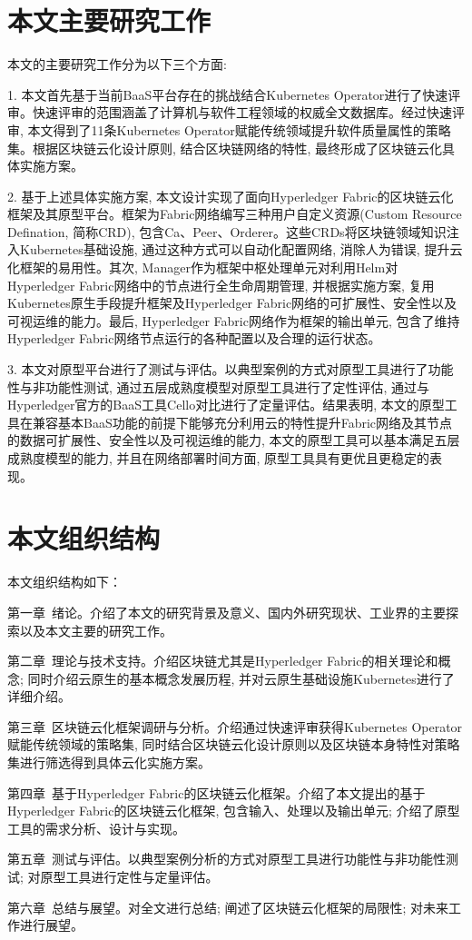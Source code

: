 \section{本文主要研究工作}

本文的主要研究工作分为以下三个方面: 

1. 本文首先基于当前BaaS平台存在的挑战结合Kubernetes Operator进行了快速评审。快速评审的范围涵盖了计算机与软件工程领域的权威全文数据库。经过快速评审, 本文得到了11条Kubernetes Operator赋能传统领域提升软件质量属性的策略集。根据区块链云化设计原则, 结合区块链网络的特性, 最终形成了区块链云化具体实施方案。

2. 基于上述具体实施方案, 本文设计实现了面向Hyperledger Fabric的区块链云化框架及其原型平台。框架为Fabric网络编写三种用户自定义资源(Custom Resource Defination, 简称CRD), 包含Ca、Peer、Orderer。这些CRDs将区块链领域知识注入Kubernetes基础设施, 通过这种方式可以自动化配置网络, 消除人为错误, 提升云化框架的易用性。其次, Manager作为框架中枢处理单元对利用Helm对Hyperledger Fabric网络中的节点进行全生命周期管理, 并根据实施方案, 复用Kubernetes原生手段提升框架及Hyperledger Fabric网络的可扩展性、安全性以及可视运维的能力。最后, Hyperledger Fabric网络作为框架的输出单元, 包含了维持Hyperledger Fabric网络节点运行的各种配置以及合理的运行状态。

3. 本文对原型平台进行了测试与评估。以典型案例的方式对原型工具进行了功能性与非功能性测试, 通过五层成熟度模型对原型工具进行了定性评估, 通过与Hyperledger官方的BaaS工具Cello对比进行了定量评估。结果表明, 本文的原型工具在兼容基本BaaS功能的前提下能够充分利用云的特性提升Fabric网络及其节点的数据可扩展性、安全性以及可视运维的能力, 本文的原型工具可以基本满足五层成熟度模型的能力, 并且在网络部署时间方面, 原型工具具有更优且更稳定的表现。


\section{本文组织结构}

本文组织结构如下：

第一章~绪论。介绍了本文的研究背景及意义、国内外研究现状、工业界的主要探索以及本文主要的研究工作。

第二章~理论与技术支持。介绍区块链尤其是Hyperledger Fabric的相关理论和概念; 同时介绍云原生的基本概念发展历程, 并对云原生基础设施Kubernetes进行了详细介绍。

第三章~区块链云化框架调研与分析。介绍通过快速评审获得Kubernetes Operator赋能传统领域的策略集, 同时结合区块链云化设计原则以及区块链本身特性对策略集进行筛选得到具体云化实施方案。

第四章~基于Hyperledger Fabric的区块链云化框架。介绍了本文提出的基于Hyperledger Fabric的区块链云化框架, 包含输入、处理以及输出单元; 介绍了原型工具的需求分析、设计与实现。

第五章~测试与评估。以典型案例分析的方式对原型工具进行功能性与非功能性测试; 对原型工具进行定性与定量评估。

第六章~总结与展望。对全文进行总结; 阐述了区块链云化框架的局限性; 对未来工作进行展望。


